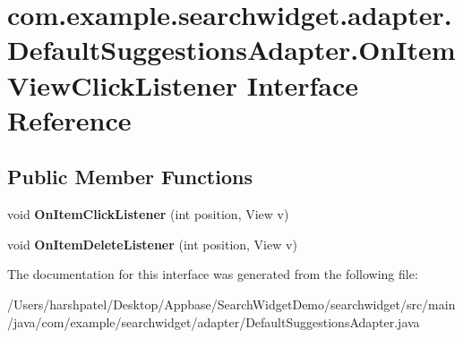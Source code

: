 \hypertarget{interfacecom_1_1example_1_1searchwidget_1_1adapter_1_1_default_suggestions_adapter_1_1_on_item_view_click_listener}{}\section{com.\+example.\+searchwidget.\+adapter.\+Default\+Suggestions\+Adapter.\+On\+Item\+View\+Click\+Listener Interface Reference}
\label{interfacecom_1_1example_1_1searchwidget_1_1adapter_1_1_default_suggestions_adapter_1_1_on_item_view_click_listener}
\subsection*{Public Member Functions}
\begin{DoxyCompactItemize}
\item 
\mbox{\label{interfacecom_1_1example_1_1searchwidget_1_1adapter_1_1_default_suggestions_adapter_1_1_on_item_view_click_listener_a2bda06ac8344c754954b2fa6f6c08469}} 
void {\bfseries On\+Item\+Click\+Listener} (int position, View v)
\item 
\mbox{\label{interfacecom_1_1example_1_1searchwidget_1_1adapter_1_1_default_suggestions_adapter_1_1_on_item_view_click_listener_a4c3dd27b260e7f4aa7d048e09698fa58}} 
void {\bfseries On\+Item\+Delete\+Listener} (int position, View v)
\end{DoxyCompactItemize}


The documentation for this interface was generated from the following file\+:\begin{DoxyCompactItemize}
\item 
/\+Users/harshpatel/\+Desktop/\+Appbase/\+Search\+Widget\+Demo/searchwidget/src/main/java/com/example/searchwidget/adapter/Default\+Suggestions\+Adapter.\+java\end{DoxyCompactItemize}
